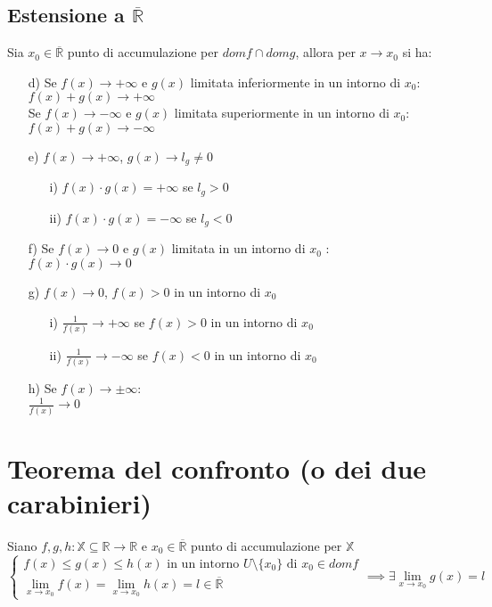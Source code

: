 \subsection{Estensione a $\overline{\mathbb{R}}$ }
Sia $x_0 \in \overline{\mathbb{R}}$ punto di accumulazione per $domf \cap domg$, allora per $x \to x_0$ si ha:
\begin{enumerate}
\item[d)]Se $f(x) \to +\infty$ e $g(x)$ limitata inferiormente in un intorno di $x_0$:\\
$f(x)+g(x) \longrightarrow +\infty$ \\
Se $f(x) \to -\infty$ e $g(x)$ limitata superiormente in un intorno di $x_0$:\\
$f(x)+g(x) \longrightarrow -\infty$
\item[e)]$f(x) \to +\infty$, $g(x) \to l_g \not=0$
\begin{itemize}
\item[i)]$f(x) \cdot g(x) = +\infty$ se $l_g>0$
\item[ii)]$f(x) \cdot g(x) = -\infty$ se $l_g<0$
\end{itemize}
\item[f)]Se $f(x) \to 0$ e $g(x)$ limitata in un intorno di $x_0$ :\\
$f(x)\cdot g(x) \longrightarrow 0$
\item[g)]$f(x) \to 0$, $f(x)>0$ in un intorno di $x_0$
\begin{itemize}
\item[i)]$\frac{1}{f(x)} \to +\infty$ se $f(x)>0$ in un intorno di $x_0$
\item[ii)]$\frac{1}{f(x)} \to -\infty$ se $f(x)<0$ in un intorno di $x_0$
\end{itemize}
\item[h)]Se $f(x) \to \pm \infty$: \\
$\frac{1}{f(x)} \longrightarrow 0$
\end{enumerate}
\section{Teorema del confronto (o dei due carabinieri)}
Siano $f,g,h: \mathbb{X} \subseteq \mathbb{R} \to \mathbb{R}$ e $x_0 \in \mathbb{\overline{R}}$ punto di accumulazione per $\mathbb{X}$\\
\begin{equation}
\begin{cases}
f(x) \leq g(x) \leq h(x) \text{ in un intorno } U \setminus \{x_0\} \text{ di } x_0 \in domf\\
\displaystyle \lim_{x \to x_0}f(x) = \lim_{x \to x_0}h(x) = l \in \mathbb{\overline{R}}
\end{cases}
\implies \exists \displaystyle \lim_{x \to x_0}g(x) = l
\end{equation}
